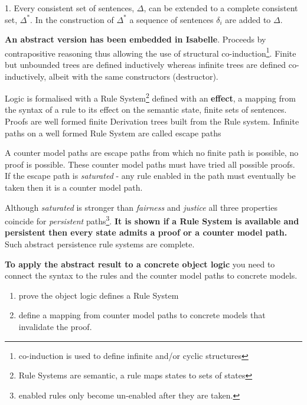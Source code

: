 1. Every consistent set of sentences, $\Delta$,  can be extended to a complete consistent set, $\Delta^*$. In the construction of $\Delta^*$ a sequence of sentences $\delta_i$ are added to $\Delta$.






{\bf An abstract version has been embedded in Isabelle}. Proceeds  by contrapositive reasoning thus allowing the use of structural co-induction\footnote{co-induction is used to define infinite and/or cyclic structures}.  Finite but unbounded  trees are defined inductively  whereas infinite trees are defined co-inductively, albeit with the same constructors (destructor). 


Logic is formalised with a Rule System\footnote{Rule Systems are semantic, a rule maps states to sets of states } defined with an {\bf effect}, a mapping from the syntax of a rule to its effect on the semantic state, finite sets of sentences. Proofs are well formed finite Derivation trees built from the Rule system. Infinite paths on a well formed Rule System are called escape paths


A counter model paths are escape paths from  which no finite path is possible, no proof is possible. These counter model paths must have tried all possible proofs. If  the escape path is \emph{saturated} - any rule enabled in the path must eventually be taken then it is a counter model path. 


Although \emph{saturated} is stronger than \emph{fairness} and \emph{justice} all three properties coincide for \emph{persistent} paths\footnote{enabled rules only become un-enabled after they are taken.}.
   {\bf It is shown if a  Rule System is   available and persistent then every state admits a proof or a counter model path. }
     Such abstract persistence rule systems are complete.

{\bf To apply the abstract result to a concrete object logic} you need to connect  the syntax to the rules and the counter model paths to concrete models.
\begin{enumerate}
\item prove the object logic  defines a Rule System
\item define a mapping from counter model paths to concrete  models that invalidate the proof.
\end{enumerate}




